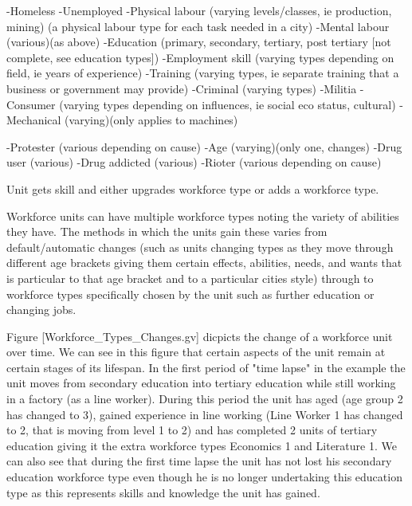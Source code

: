 -Homeless
-Unemployed
-Physical labour (varying levels/classes, ie production, mining)
	(a physical labour type for each task needed in a city) 
-Mental labour (various)(as above)
-Education (primary, secondary, tertiary, post tertiary [not complete, see education types])
-Employment skill (varying types depending on field, ie years of experience)
-Training (varying types, ie separate training that a business or government may provide)
-Criminal (varying types)
-Militia
-Consumer (varying types depending on influences, ie social eco status, cultural)
-Mechanical (varying)(only applies to machines)

-Protester (various depending on cause)
-Age (varying)(only one, changes)
-Drug user (various)
-Drug addicted (various)
-Rioter (various depending on cause)



Unit gets skill and either upgrades workforce type or adds a workforce type.

Workforce units can have multiple workforce types noting the variety of abilities they have. The methods in which the units gain these varies from default/automatic changes (such as units changing types as they move through different age brackets giving them certain effects, abilities, needs, and wants that is particular to that age bracket and to a particular cities style) through to workforce types specifically chosen by the unit such as further education or changing jobs. 

Figure [Workforce_Types_Changes.gv] dicpicts the change of a workforce unit over time. We can see in this figure that certain aspects of the unit remain at certain stages of its lifespan. In the first period of "time lapse" in the example the unit moves from secondary education into tertiary education while still working in a factory (as a line worker). During this period the unit has aged (age group 2 has changed to 3), gained experience in line working (Line Worker 1 has changed to 2, that is moving from level 1 to 2) and has completed 2 units of tertiary education giving it the extra workforce types Economics 1 and Literature 1. We can also see that during the first time lapse the unit has not lost his secondary education workforce type even though he is no longer undertaking this education type as this represents skills and knowledge the unit has gained. 

